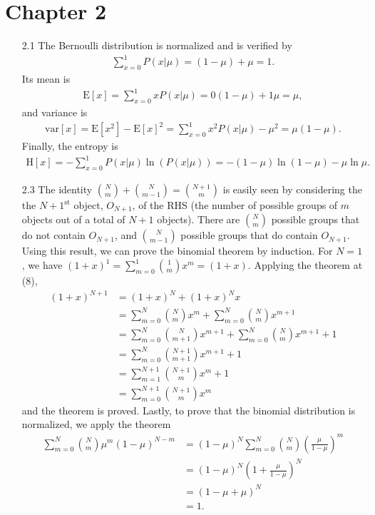 \documentclass[]{article}
\begin{document}
\begin{enumerate}
\end{enumerate}

\section*{Chapter 2}

\begin{enumerate}
	\item[2.1] The Bernoulli distribution is normalized and is verified by
	\begin{align*}
	\sum_{x=0}^{1}P(x|\mu) = (1-\mu) + \mu = 1.
	\end{align*}
	Its mean is
	\begin{align*}
	\text{E}[x]=\sum_{x=0}^{1}xP(x|\mu)=0(1-\mu) + 1\mu=\mu,
	\end{align*}
	and variance is
	\begin{align*}
	\text{var}[x]=\text{E}[x^2]-\text{E}[x]^2=\sum_{x=0}^{1}x^2P(x|\mu) - \mu^2=\mu(1-\mu).
	\end{align*}
	Finally, the entropy is
	\begin{align*}
	\text{H}[x]=-\sum_{x=0}^{1}P(x|\mu)\ln \left(P(x|\mu)\right)=-(1-\mu)\ln(1-\mu)-\mu \ln \mu.
	\end{align*}
	\item[2.3] The identity $\binom{N}{m} + \binom{N}{m-1}=\binom{N+1}{m}$ is easily seen by considering the the $N+1^\text{st}$ object, $O_{N+1}$, of the RHS (the number of possible groups of $m$ objects out of a total of $N+1$ objects). There are $\binom{N}{m}$ possible groups that do not contain $O_{N+1}$, and $\binom{N}{m-1}$ possible groups that do contain $O_{N+1}$. Using this result, we can prove the binomial theorem by induction. For $N=1$, we have $(1+x)^1=\sum_{m=0}^{1}\binom{1}{m}x^m = (1+x)$. Applying the theorem at (8),
	\begin{align*}
	(1+x)^{N+1}&=(1+x)^N+(1+x)^Nx \\
	&= \sum_{m=0}^{N}\binom{N}{m}x^m + \sum_{m=0}^{N}\binom{N}{m}x^{m+1} \tag{8} \\
	&=\sum_{m=0}^{N} \binom{N}{m+1}x^{m+1} + \sum_{m=0}^{N} \binom{N}{m}x^{m+1}  +1 \\
	&=\sum_{m=0}^{N} \binom{N+1}{m+1} x^{m+1} + 1 \\
	&=\sum_{m=1}^{N+1} \binom{N+1}{m} x^{m} + 1 \\
	&=\sum_{m=0}^{N+1}\binom{N+1}{m}x^m
	\end{align*}
	and the theorem is proved. Lastly, to prove that the binomial distribution is normalized, we apply the theorem
	\begin{align*}
	\sum_{m=0}^{N}\binom{N}{m}\mu^m (1-\mu)^{N-m} &= (1-\mu)^N \sum_{m=0}^{N} \binom{N}{m} \left(\frac{\mu}{1-\mu}\right)^m \\
	&= (1-\mu)^N \left(1 + \frac{\mu}{1-\mu}\right)^N \\
	&= \left(1-\mu + \mu \right)^N \\
	&=1.
	\end{align*}
	

\end{enumerate}
\end{document}
